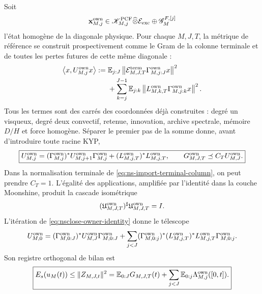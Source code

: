 Soit
\[
 \mathbf x_{M,j}^{\rm own}
 \in\mathscr K_{M,j}^{\rm PCF}
 \widehat\otimes\mathcal E_{\rm exc}
 \oplus\mathscr G_M^{F,[j]}
\]
l'état homogène de la diagonale physique. Pour chaque \(M,J,T\), la métrique de référence se construit prospectivement comme le Gram de la colonne terminale et de toutes les pertes futures de cette même diagonale :
\begin{equation}
 \begin{aligned}
 \left\langle x,U_{M,j}^{\rm own}x\right\rangle
 :={}&
 \mathbb E_{j:J}
 \left\|\mathcal E_{M,J,T}^{\rm term}
       \Gamma_{M,j:J}^{\rm own}x\right\|^2\\
 &+\sum_{k=j}^{J-1}\mathbb E_{j:k}
 \left\|L_{M,k,T}^{\rm own}
       \Gamma_{M,j:k}^{\rm own}x\right\|^2 .
 \end{aligned}
 \label{eq:nsclose-owner-metric-definition}
\end{equation}
Tous les termes sont des carrés des coordonnées déjà construites : degré un visqueux, degré deux convectif, retenue, innovation, archive spectrale, mémoire \(D/H\) et force homogène. Séparer le premier pas de la somme donne, avant d'introduire toute racine KYP,
\begin{equation}
 \boxed{
 U_{M,j}^{\rm own}
 =
 (\Gamma_{M,j}^{\rm own})^*
 U_{M,j+1}^{\rm own}\Gamma_{M,j}^{\rm own}
 +(L_{M,j,T}^{\rm own})^*L_{M,j,T}^{\rm own},
 \qquad
 G_{M,J,T}^{\rm own}\preceq C_TU_{M,J}^{\rm own}.}
 \label{eq:nsclose-proprietary-terminal-gate}
\end{equation}
\label{eq:nsclose-owner-identity}
Dans la normalisation terminale de \eqref{eq:ns-import-terminal-column}, on peut prendre \(C_T=1\). L'égalité des applications, amplifiée par l'identité dans la couche Moonshine, produit la cascade isométrique
\begin{equation}
 (\mathfrak U_{M,J,T}^{\rm own})^{\sharp}
 \mathfrak U_{M,J,T}^{\rm own}=I.
 \label{eq:nsclose-proprietary-full-cascade}
\end{equation}
L'itération de \eqref{eq:nsclose-owner-identity} donne le télescope
\begin{equation}
 U_{M,0}^{\rm own}
 =
 (\Gamma_{M,0:J}^{\rm own})^*U_{M,J}^{\rm own}
  \Gamma_{M,0:J}^{\rm own}
 +\sum_{j<J}(\Gamma_{M,0:j}^{\rm own})^*
  (L_{M,j,T}^{\rm own})^*L_{M,j,T}^{\rm own}
  \Gamma_{M,0:j}^{\rm own}.
 \label{eq:nsclose-owner-telescope}
\end{equation}
Son registre orthogonal de bilan est
\begin{equation}
 \boxed{
 E_s(u_M(t))\le\|Z_{M,J,t}\|^2
 =\mathbb E_{0:J}G_{M,J,T}(t)
 +\sum_{j<J}\mathbb E_{0:j}
   \Lambda_{M,j}^{\rm own}([0,t]).}
 \label{eq:nsclose-proprietary-ledger}
\end{equation}
